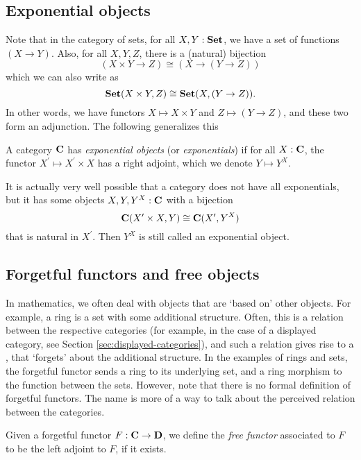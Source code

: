 \subsection{Exponential objects}
Note that in the category of sets, for all $ X, Y: \mathbf{Set} $, we have a set of functions $ (X \to Y) $. Also, for all $ X, Y, Z $, there is a (natural) bijection
\[ (X \times Y \to Z) \cong (X \to (Y \to Z)) \]
which we can also write as
\[ \mathbf{Set}(X \times Y, Z) \cong \mathbf{Set}(X, (Y \to Z)). \]
In other words, we have functors $ X \mapsto X \times Y $ and $ Z \mapsto (Y \to Z) $, and these two form an adjunction. The following generalizes this
\begin{definition}
  A category $ \mathbf{C} $ has \textit{exponential objects} (or \textit{exponentials}) if for all $ X: \mathbf{C} $, the functor $ X^\prime \mapsto X^\prime \times X $ has a right adjoint, which we denote $ Y \mapsto Y^X $.
\end{definition}

\begin{remark}
  It is actually very well possible that a category does not have all exponentials, but it has some objects $ X, Y, Y^X: \mathbf{C} $ with a bijection
  \[ \mathbf{C}(X^\prime \times X, Y) \cong \mathbf{C}(X^\prime, Y^X) \]
  that is natural in $ X^\prime $. Then $ Y^X $ is still called an exponential object.
\end{remark}

\subsection{Forgetful functors and free objects}

In mathematics, we often deal with objects that are `based on' other objects. For example, a ring is a set with some additional structure. Often, this is a relation between the respective categories (for example, in the case of a displayed category, see Section \ref{sec:displayed-categories}), and such a relation gives rise to a , that `forgets' about the additional structure. In the examples of rings and sets, the forgetful functor sends a ring to its underlying set, and a ring morphism to the function between the sets. However, note that there is no formal definition of forgetful functors. The name is more of a way to talk about the perceived relation between the categories.

\begin{definition}
  Given a forgetful functor $ F: \mathbf{C} \to \mathbf{D} $, we define the \textit{free functor} associated to $ F $ to be the left adjoint to $ F $, if it exists.
\end{definition}

